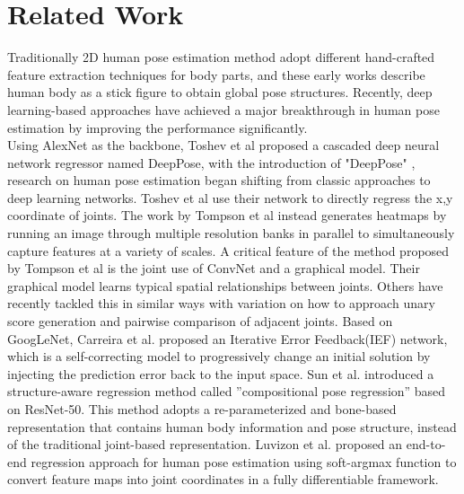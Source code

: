 \documentclass[final]{cvpr}
\begin{document}
\section{Related Work}
Traditionally 2D human pose estimation method adopt different hand-crafted feature extraction techniques for body parts, and these early works describe human body as a stick figure to obtain global pose structures. Recently, deep learning-based approaches have achieved a major breakthrough in human pose estimation by improving the performance significantly.\\
\indent Using AlexNet\cite{krizhevsky2017imagenet} as the backbone, Toshev et al\cite{toshev2014deeppose} proposed a cascaded deep neural network regressor named DeepPose, with the introduction of "DeepPose" , research on human pose estimation began shifting from classic approaches to deep learning networks. Toshev et al use their network to directly regress the x,y coordinate of joints. The work by Tompson et al\cite{tompson2014joint} instead generates heatmaps by running an image through multiple resolution banks in parallel to simultaneously capture features at a variety of scales. A critical feature of the method proposed by Tompson et al\cite{tompson2014joint} is the joint use of ConvNet and a graphical model. Their graphical model learns typical spatial relationships between joints. Others have recently tackled this in similar ways\cite{pishchulin2016deepcut} with variation on how to approach unary score generation  and pairwise comparison of adjacent joints. Based on GoogLeNet\cite{szegedy2015going}, Carreira et al.\cite{carreira2016human} proposed an Iterative Error Feedback(IEF) network, which is a self-correcting model to progressively  change an initial solution by injecting the prediction error back to the input space. Sun et al.\cite{sun2017compositional} introduced a structure-aware regression method called  ”compositional  pose  regression”  based  on ResNet-50\cite{he2016deep}. This method adopts a re-parameterized and bone-based representation that contains human body information and pose structure, instead of the traditional joint-based representation. Luvizon et al.\cite{luvizon2019human} proposed an end-to-end regression approach for human pose estimation using soft-argmax function to convert feature maps into joint coordinates in a fully differentiable framework.\\
\end{document}
